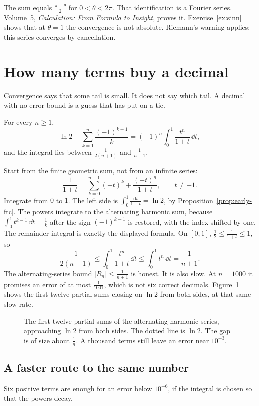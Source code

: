 The sum equals $\frac{\pi-\theta}2$ for $0<\theta<2\pi$. That identification is a Fourier series. Volume~5, \emph{Calculation: From Formula to Insight}, proves it. Exercise~\ref{ex:sinn} shows that at $\theta=1$ the convergence is not absolute. Riemann's warning applies: this series converges by cancellation.

\section{How many terms buy a decimal}

Convergence says that some tail is small. It does not say which tail. A decimal with no error bound is a guess that has put on a tie.

\begin{examplex}
For every $n\ge1$,
\[
\ln2-\sum_{k=1}^n\frac{(-1)^{k-1}}k=(-1)^n\int_0^1\frac{t^n}{1+t}\,\dd t,
\]
and the integral lies between $\frac1{2(n+1)}$ and $\frac1{n+1}$.
\end{examplex}

Start from the finite geometric sum, not from an infinite series:
\[
\frac1{1+t}=\sum_{k=0}^{n-1}(-t)^k+\frac{(-t)^n}{1+t},\qquad t\ne-1.
\]
Integrate from $0$ to $1$. The left side is $\int_0^1\frac{\mathrm dt}{1+t}=\ln2$, by Proposition~\ref{prop:early-ftc}. The powers integrate to the alternating harmonic sum, because $\int_0^1 t^{k-1}\,\dd t=\frac1k$ after the sign $(-1)^{k-1}$ is restored, with the index shifted by one. The remainder integral is exactly the displayed formula. On $[0,1]$, $\frac12\le\frac1{1+t}\le1$, so
\[
\frac1{2(n+1)}\le\int_0^1\frac{t^n}{1+t}\,\dd t\le\int_0^1 t^n\,\dd t=\frac1{n+1}.
\]
The alternating-series bound $|R_n|\le\frac1{n+1}$ is honest. It is also slow. At $n=1000$ it promises an error of at most $\frac1{1001}$, which is not six correct decimals. Figure~\ref{fig:slow} shows the first twelve partial sums closing on $\ln2$ from both sides, at that same slow rate.

\begin{figure}[ht]
\centering
{}
\caption{The first twelve partial sums of the alternating harmonic series, approaching $\ln2$ from both sides. The dotted line is $\ln2$. The gap is of size about $\frac1n$. A thousand terms still leave an error near $10^{-3}$.}
\label{fig:slow}
\end{figure}

\subsection*{A faster route to the same number}
Six positive terms are enough for an error below $10^{-6}$, if the integral is chosen so that the powers decay.

